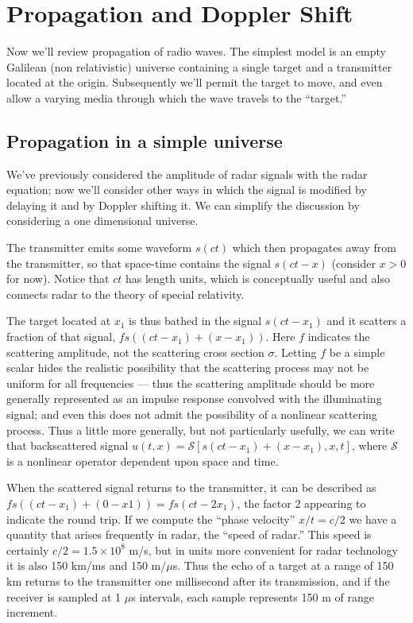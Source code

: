 \chapter{Propagation and Doppler Shift}

\setlength{\arraycolsep}{0.5ex}

Now we'll review propagation of radio waves.  The simplest model is an
empty Galilean (non relativistic) universe containing a single target
and a transmitter located at the origin.  Subsequently we'll permit
the target to move, and even allow a varying media through which the
wave travels to the ``target.''

\section{Propagation in a simple universe}

We've previously considered the amplitude of radar signals with the
radar equation; now we'll consider other ways in which the signal is
modified by delaying it and by Doppler shifting it.  We can simplify
the discussion by considering a one dimensional universe.

The transmitter emits some waveform $s(ct)$ which then propagates away
from the transmitter, so that space-time contains the signal $s(ct -
x)$ (consider $x > 0$ for now).  Notice that $ct$ has length units,
which is conceptually useful and also connects radar to the theory of
special relativity.

The target located at $x_1$ is thus bathed in the signal $s(ct - x_1)$
and it scatters a fraction of that signal, $f s((ct - x_1) + (x
- x_1))$.  Here $f$ indicates the scattering amplitude, not the
scattering cross section $\sigma$.  Letting $f$ be a simple scalar
hides the realistic possibility that the scattering process may not be
uniform for all frequencies --- thus the scattering amplitude should
be more generally represented as an impulse response convolved with
the illuminating signal; and even this does not admit the 
possibility of a nonlinear scattering process.  Thus a little more
generally, but not particularly usefully, we can write that
backscattered signal $u(t,x) = \mathcal{S}[s(ct - x_1) + (x -
x_1),x,t]$, where $\mathcal S$ is a nonlinear operator dependent upon
space and time.

When the scattered signal returns to the transmitter, it can be
described as $f s((ct - x_1) + (0 - x1)) = f s(ct - 2x_1)$,
the factor $2$ appearing to indicate the round trip.  If we compute
the ``phase velocity'' $x/t = c/2$ we have a quantity that arises
frequently in radar, the ``speed of radar.''  This speed is certainly
$c/2 = 1.5\times 10^8$ m/s, but in units more convenient for radar
technology it is also 150 km/ms and 150 m/$\mu$s.  Thus the echo of a
target at a range of 150 km returns to the transmitter one millisecond
after its transmission, and if the receiver is sampled at 1 $\mu$s
intervals, each sample represents 150 m of range increment.

